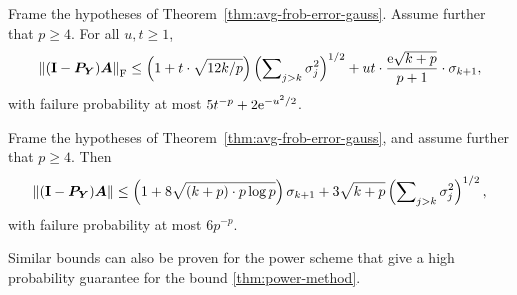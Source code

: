 \begin{theorem} \label{thm:tail-frob-error-gauss}
Frame the hypotheses of Theorem~\ref{thm:avg-frob-error-gauss}.
Assume further that $p \geq 4$.  For all $u, t \geq 1$,
$$
\left\Vert { (\mathbf{I}- \bm{P}_{\bm{Y}}) \bm{A} } \right\Vert_{\mathrm{F}}
    \leq \left( 1 + t \cdot \sqrt{12k/p} \right)
    \left( \sum\nolimits_{j > k} \sigma_j^2 \right)^{1/2}
    + ut \cdot \frac{\mathrm{e}\sqrt{k+p}}{p+1} \cdot \sigma_{k+1},
$$
with failure probability at most $5 t^{-p} + 2 \mathrm{e}^{-u^2/2}$.
\end{theorem}

\begin{theorem} \label{thm:tail-spec-error-gauss}
Frame the hypotheses of Theorem~\ref{thm:avg-frob-error-gauss}, and assume further that $p \geq 4$.  Then
$$
\left\Vert { (\mathbf{I}- \bm{P}_{\bm{Y}}) \bm{A} } \right\Vert
    \leq \left( 1 + 8 \sqrt{(k + p) \cdot p \log p} \right) \sigma_{k+1}
        + 3 \sqrt{k+p} \left( \sum\nolimits_{j > k} \sigma_j^2 \right)^{1/2},
$$
with failure probability at most $6 p^{-p}$.
\end{theorem}
Similar bounds can also be proven for the power scheme 
\cite{halko2011finding} that give a high probability guarantee for 
the bound \ref{thm:power-method}.


